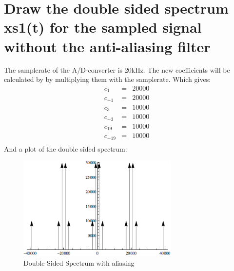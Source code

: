 \documentclass[a4wide,10pt]{article}
\begin{document}

\newpage

\section{Draw the double sided spectrum xs1(t) for the sampled signal without the
anti-aliasing filter} %
\label{sec:draw_the_double_sided_spectrum_xs1_t_for_the_sampled_signal_without_the_anti_aliasing_filter}
The samplerate of the A/D-converter is 20kHz. The new coefficients will be calculated by by multiplying them with the samplerate. Which gives:
\begin{eqnarray}
	c_1&=&20000 \nonumber \\
	c_{-1}&=&20000 \nonumber \\
	c_3&=&10000 \nonumber \\
	c_{-3}&=&10000 \nonumber \\
	c_{19}&=&10000 \nonumber \\
	c_{-19}&=&10000 \nonumber \\
\end{eqnarray}
And a plot of the double sided spectrum:
\begin{figure}[htbp]
	\centering
		\includegraphics[width=8cm]{images/double-sided-spectrum-2.png}
	\caption{Double Sided Spectrum with aliasing}
	\label{fig:images_double-sided-spectrum-2}
\end{figure}
\end{document}
